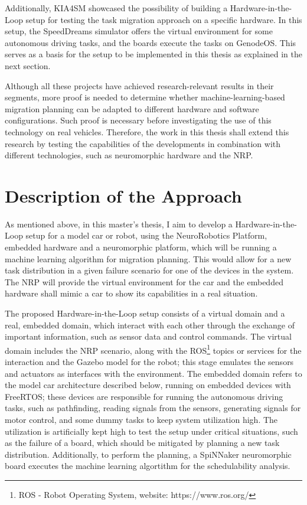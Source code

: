 Additionally, KIA4SM showcased the possibility of building a Hardware-in-the-Loop setup for testing the task migration approach on a specific hardware. In this setup, the SpeedDreams simulator offers the virtual environment for some autonomous driving tasks, and the boards execute the tasks on GenodeOS. This serves as a basis for the setup to be implemented in this thesis as explained in the next section.

Although all these projects have achieved research-relevant results in their segments, more proof is needed to determine whether machine-learning-based migration planning can be adapted to different hardware and software configurations. Such proof is necessary before investigating the use of this technology on real vehicles. Therefore, the work in this thesis shall extend this research by testing the capabilities of the developments in combination with different technologies, such as neuromorphic hardware and the NRP.

\section*{Description of the Approach}\label{section:descriptionapproach}
As mentioned above, in this master’s thesis, I aim to develop a Hardware-in-the-Loop setup for a model car or robot, using the NeuroRobotics Platform, embedded hardware and a neuromorphic platform, which will be running a machine learning algorithm for migration planning. This would allow for a new task distribution in a given failure scenario for one of the devices in the system. The NRP will provide the virtual environment for the car and the embedded hardware shall mimic a car to show its capabilities in a real situation.

The proposed Hardware-in-the-Loop setup consists of a virtual domain and a real, embedded domain, which interact with each other through the exchange of important information, such as sensor data and control commands. The virtual domain includes the NRP scenario, along with the ROS\footnote{ROS - Robot Operating System, website: https://www.ros.org/} topics or services for the interaction and the Gazebo model for the robot; this stage emulates the sensors and actuators as interfaces with the environment. The embedded domain refers to the model car architecture described below, running on embedded devices with FreeRTOS; these devices are responsible for running the autonomous driving tasks, such as pathfinding, reading signals from the sensors, generating signals for motor control, and some dummy tasks to keep system utilization high. The utilization is artificially kept high to test the setup under critical situations, such as the failure of a board, which should be mitigated by planning a new task distribution. Additionally, to perform the planning, a SpiNNaker neuromorphic board executes the machine learning algortithm for the schedulability analysis.

